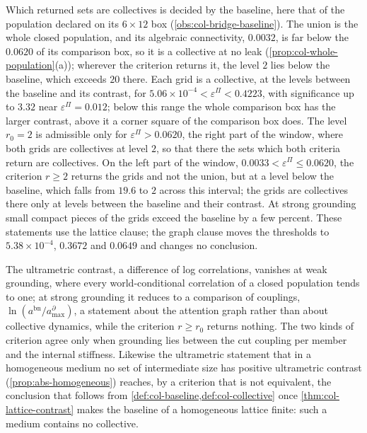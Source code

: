 \begin{remark}
Which returned sets are collectives is decided by the baseline, here that of the population declared on its $6\times12$ box (\cref{obs:col-bridge-baseline}). The union is the whole closed population, and its algebraic connectivity, $0.0032$, is far below the $0.0620$ of its comparison box, so it is a collective at no leak (\cref{prop:col-whole-population}(a)); wherever the criterion returns it, the level $2$ lies below the baseline, which exceeds $20$ there. Each grid is a collective, at the levels between the baseline and its contrast, for $5.06\times10^{-4}<\varepsilon^\Pi<0.4223$, with significance up to $3.32$ near $\varepsilon^\Pi=0.012$; below this range the whole comparison box has the larger contrast, above it a corner square of the comparison box does. The level $r_0=2$ is admissible only for $\varepsilon^\Pi>0.0620$, the right part of the window, where both grids are collectives at level $2$, so that there the sets which both criteria return are collectives. On the left part of the window, $0.0033<\varepsilon^\Pi\le0.0620$, the criterion $r\ge2$ returns the grids and not the union, but at a level below the baseline, which falls from $19.6$ to $2$ across this interval; the grids are collectives there only at levels between the baseline and their contrast. At strong grounding small compact pieces of the grids exceed the baseline by a few percent. These statements use the lattice clause; the graph clause moves the thresholds to $5.38\times10^{-4}$, $0.3672$ and $0.0649$ and changes no conclusion.

The ultrametric contrast, a difference of log correlations, vanishes at weak grounding, where every world-conditional correlation of a closed population tends to one; at strong grounding it reduces to a comparison of couplings, $\ln(a^{\mathrm{bn}}/a^\partial_{\max})$, a statement about the attention graph rather than about collective dynamics, while the criterion $r\ge r_0$ returns nothing. The two kinds of criterion agree only when grounding lies between the cut coupling per member and the internal stiffness. Likewise the ultrametric statement that in a homogeneous medium no set of intermediate size has positive ultrametric contrast (\cref{prop:abs-homogeneous}) reaches, by a criterion that is not equivalent, the conclusion that follows from \cref{def:col-baseline,def:col-collective} once \cref{thm:col-lattice-contrast} makes the baseline of a homogeneous lattice finite: such a medium contains no collective.
\end{remark}

